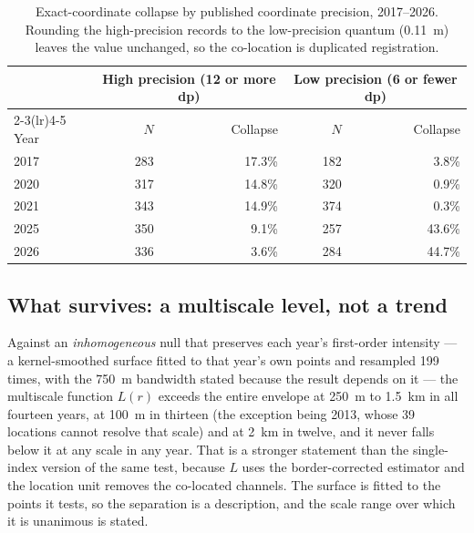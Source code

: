 \documentclass{article}
\newcommand{\dropNt}{39}
\begin{document}
\begin{table}[htbp]
\centering
\caption{Exact-coordinate collapse by published coordinate precision, 2017--2026. Rounding the high-precision records to the low-precision quantum (\SI{0.11}{\meter}) leaves the value unchanged, so the co-location is duplicated registration.}
\label{tab:precision}
\footnotesize
\setlength{\tabcolsep}{5pt}
\begin{tabular}{lrrrr}
\toprule
 & \multicolumn{2}{c}{High precision (12 or more dp)} & \multicolumn{2}{c}{Low precision (6 or fewer dp)} \\
\cmidrule(lr){2-3}\cmidrule(lr){4-5}
Year & $N$ & Collapse & $N$ & Collapse \\
\midrule
2017 & 283 & 17.3\% & 182 & \phantom{0}3.8\% \\
2020 & 317 & 14.8\% & 320 & \phantom{0}0.9\% \\
2021 & 343 & 14.9\% & 374 & \phantom{0}0.3\% \\
2025 & 350 & \phantom{0}9.1\% & 257 & 43.6\% \\
2026 & 336 & \phantom{0}3.6\% & 284 & 44.7\% \\
\bottomrule
\end{tabular}
\end{table}

\subsection{What survives: a multiscale level, not a trend}
\label{sec:results-mech}

Against an \emph{inhomogeneous} null that preserves each year's first-order intensity --- a
kernel-smoothed surface fitted to that year's own points and resampled \num{199} times, with the
\SI{750}{\meter} bandwidth stated because the result depends on it --- the multiscale function
$L(r)$ exceeds the entire envelope at \SI{250}{\meter} to \SI{1.5}{\kilo\meter} in all fourteen
years, at \SI{100}{\meter} in thirteen (the exception being 2013, whose \dropNt{} locations
cannot resolve that scale) and at \SI{2}{\kilo\meter} in twelve, and it never falls below it at
any scale in any year. That is a stronger statement than the single-index version of the same
test, because $L$ uses the border-corrected estimator and the location unit removes the co-located channels.
The surface is fitted to the points it tests, so the separation is a description, and the
scale range over which it is unanimous is stated.
\end{document}
